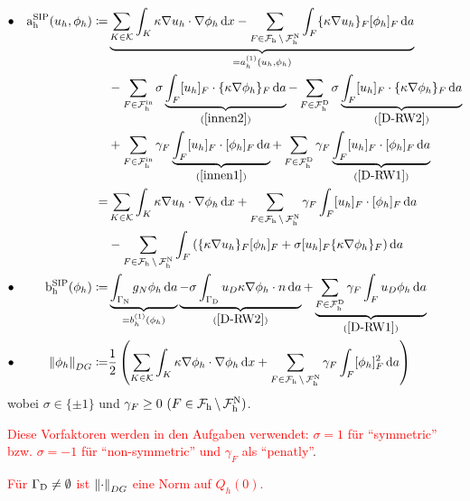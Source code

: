 \begin{define}
	\begin{align*}
		&\bullet &\asip(u_h, \phi_h) \coloneqq &\underbrace{\sum_{K \in \mathcal{K}} \int_K \kappa \nabla u_h \cdot \nabla \phi_h \diff x - \sum_{F \in \F\setminus\FN } \int_{F} \{\kappa \nabla u_h \}_F [\phi_h]_F \diff a}_{= a_h^{(1)}(u_h, \phi_h)}\\
		&&&- \sum_{F \in \FIn} \sigma \underbrace{ \int_F [u_h]_F \cdot \{ \kappa \nabla \phi_h \}_F \diff a}_{(\ref{innen2})} - \sum_{F \in \FD} \sigma \underbrace{ \int_F [u_h]_F \cdot \{ \kappa \nabla \phi_h \}_F \diff a}_{(\ref{D-RW2})}\\
		&&&+\sum_{F \in \FIn} \gamma_F \underbrace{\int_F [u_h]_F \cdot [\phi_h]_F \diff a}_{(\ref{innen1})} + \sum_{F \in \FD} \gamma_F \underbrace{\int_F [u_h]_F \cdot [\phi_h]_F \diff a}_{(\ref{D-RW1})}\\
		&&=& \sum_{K \in \mathcal{K}} \int_K \kappa \nabla u_h \cdot \nabla \phi_h \diff x + \sum_{F \in \F\setminus\FN}  \gamma_F \int_F [u_h]_F \cdot [\phi_h]_F \diff a\\
		&&&- \sum_{F \in \F\setminus\FN} \int_F \left(  \{\kappa \nabla u_h \}_F [\phi_h]_F + \sigma [u_h]_F \{\kappa \nabla \phi_h \}_F  \right) \diff a\\
		&\bullet  &\bsip(\phi_h) \coloneqq & \underbrace{\int_{\GammaN} g_N \phi_h \diff a}_{=b_h^{(1)}(\phi_h)} \underbrace{ - \sigma \int_{\GammaD} u_D \kappa \nabla \phi_h \cdot n \diff a}_{(\ref{D-RW2})} + \underbrace{\sum_{F \in \FD} \gamma_F \int_F u_D \phi_h \diff a}_{(\ref{D-RW1})} \\
		&\bullet  &\norm{\phi_h}_{DG} \coloneqq  &\frac{1}{2} \left( \sum_{K \in \mathcal{K}} \int_{K} \kappa\nabla \phi_h \cdot \nabla \phi_h \diff x +  \sum_{F \in \F\setminus\FN }\gamma_F \int_F [ \phi_h ]_F^2 \diff a \right)
	\end{align*}
	wobei $ \sigma \in \{\pm 1\} $ und $ \gamma_F \ge 0 \ (F\in\F\setminus\FN)$.
	
	\textcolor{red}{Diese Vorfaktoren werden in den Aufgaben verwendet: $ \sigma = 1 $ für \enquote{symmetric} bzw. $ \sigma = -1 $ für \enquote{non-symmetric} und $ \gamma_F $ als \enquote{penatly}}.
	
	\textcolor{red}{Für $ \Gamma_{\text{D}} \ne \emptyset $ ist $ \norm{\cdot}_{DG} $ eine Norm auf $ Q_h(0) $.}
\end{define}

